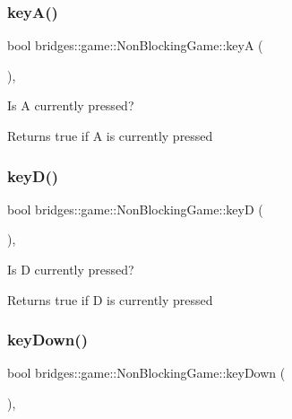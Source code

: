 \subsubsection{\texorpdfstring{keyA()}{keyA()}}
{\footnotesize\ttfamily bool bridges\+::game\+::\+Non\+Blocking\+Game\+::keyA (\begin{DoxyParamCaption}{ }\end{DoxyParamCaption})\hspace{0.3cm}{\ttfamily [inline]}, {\ttfamily [protected]}}



Is A currently pressed? 

\begin{DoxyReturn}{Returns}
true if A is currently pressed 
\end{DoxyReturn}
\mbox{\label{classbridges_1_1game_1_1_non_blocking_game_a932979445cc8acea618092b83b4a9756}} 
\subsubsection{\texorpdfstring{keyD()}{keyD()}}
{\footnotesize\ttfamily bool bridges\+::game\+::\+Non\+Blocking\+Game\+::keyD (\begin{DoxyParamCaption}{ }\end{DoxyParamCaption})\hspace{0.3cm}{\ttfamily [inline]}, {\ttfamily [protected]}}



Is D currently pressed? 

\begin{DoxyReturn}{Returns}
true if D is currently pressed 
\end{DoxyReturn}
\mbox{\label{classbridges_1_1game_1_1_non_blocking_game_a52dd79aaaee9da77fa392fb8ec37fa94}} 
\subsubsection{\texorpdfstring{keyDown()}{keyDown()}}
{\footnotesize\ttfamily bool bridges\+::game\+::\+Non\+Blocking\+Game\+::key\+Down (\begin{DoxyParamCaption}{ }\end{DoxyParamCaption})\hspace{0.3cm}{\ttfamily [inline]}, {\ttfamily [protected]}}



